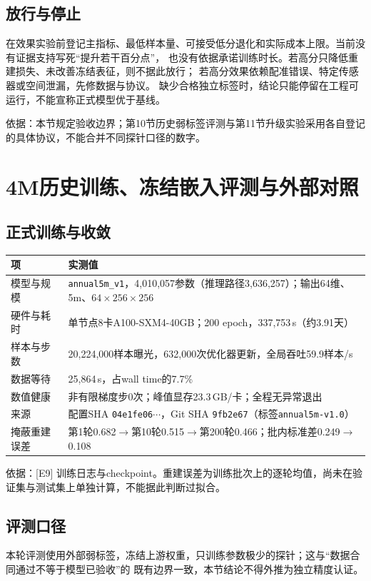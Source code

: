 \documentclass[UTF8,fontset=fandol,zihao=5,a4paper]{ctexart}
\newcommand{\source}[1]{\par{\footnotesize\color{muted}依据：#1}\par}
\begin{document}
\subsection{放行与停止}
在效果实验前登记主指标、最低样本量、可接受低分退化和实际成本上限。当前没有证据支持写死“提升若干百分点”，
也没有依据承诺训练时长。若高分只降低重建损失、未改善冻结表征，则不据此放行；
若高分效果依赖配准错误、特定传感器或空间泄漏，先修数据与协议。
缺少合格独立标签时，结论只能停留在工程可运行，不能宣称正式模型优于基线。
\source{本节规定验收边界；第10节历史弱标签评测与第11节升级实验采用各自登记的具体协议，不能合并不同探针口径的数字。}

\section{4M历史训练、冻结嵌入评测与外部对照}
\subsection{正式训练与收敛}
\noindent\begin{tabularx}{\linewidth}{@{}p{3.4cm}Y@{}}
\toprule 项 & 实测值\\\midrule
模型与规模 & \texttt{annual5m\_v1}，4{,}010{,}057参数（推理路径3{,}636{,}257）；输出64维、5m、$64\times256\times256$\\
硬件与耗时 & 单节点8卡A100-SXM4-40GB；200 epoch，337{,}753\,s（约3.91天）\\
样本与步数 & 20{,}224{,}000样本曝光，632{,}000次优化器更新，全局吞吐59.9样本/s\\
数据等待 & 25{,}864\,s，占wall time的7.7\%\\
数值健康 & 非有限梯度步0次；峰值显存23.3\,GB/卡；全程无异常退出\\
来源 & 配置SHA \texttt{04e1fe06}$\cdots$，Git SHA \texttt{9fb2e67}（标签\texttt{annual5m-v1.0}）\\
掩蔽重建误差 & 第1轮0.682$\to$第10轮0.515$\to$第200轮0.466；批内标准差0.249$\to$0.108\\\bottomrule
\end{tabularx}

\source{[E9] 训练日志与checkpoint。重建误差为训练批次上的逐轮均值，尚未在验证集与测试集上单独计算，不能据此判断过拟合。}

\subsection{评测口径}
本轮评测使用外部弱标签，冻结上游权重，只训练参数极少的探针；这与“数据合同通过不等于模型已验收”的
既有边界一致，本节结论不得外推为独立精度认证。
\end{document}
